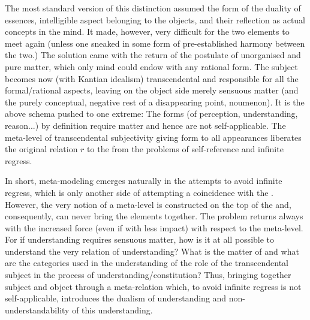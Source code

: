 The most standard version of this distinction assumed the form of the duality of
essences, intelligible aspect belonging to the objects, and their reflection as
actual concepts in the mind. It made, however, very difficult for the two
elements to meet again (unless one sneaked in some form of pre-established harmony
between the two.)  The solution came with the return of the postulate of
unorganised and pure matter, which only mind could endow with any rational form.
The subject becomes now (with Kantian idealism) transcendental and responsible
for all the formal/rational aspects, leaving on the object side merely sensuous
matter (and the purely conceptual, negative rest of a disappearing point,
noumenon). It is the above schema  pushed to one extreme:
%
%
The forms (of perception, understanding, reason...) by definition require matter
and hence are not self-applicable. The {meta}-level of transcendental
subjectivity giving form to all appearances liberates the original relation $r$
to the  from the problems of self-reference and infinite
regress.  
 
In short, {meta}-modeling emerges naturally in the  attempts to
avoid infinite regress, which is only another side of attempting a coincidence
with the . However, the very notion of a
{meta}-level is constructed on the top of the  and,
consequently, can never bring the  elements
together.  The problem returns always with the
increased force (even if with less impact) with respect to the {meta}-level.
For if understanding requires sensuous matter, how is it at all possible to
understand the very relation of understanding?  What is the matter of and what
are the categories used in the understanding of the role of the transcendental
subject in the process of understanding/constitution?  Thus, bringing together
subject and object through a meta-relation which, to avoid infinite regress is
not self-applicable, introduces the dualism of understanding and
non-understandability of this understanding.

